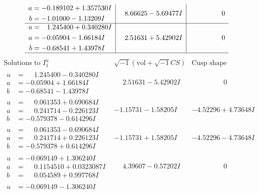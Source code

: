 \documentclass[1p]{elsarticle_modified}
\theoremstyle{definition}
\newcommand{\I}{\sqrt{-1}}
\begin{document}
$$\begin{array}{c|c|c}
\begin{aligned}
a &= -0.189102 + 1.357530 I \\
b &= -1.01000 - 1.13209 I\end{aligned}
 & \phantom{-}8.66625 - 5.69477 I & \phantom{-0.000000 } 0 \\ \hline\begin{aligned}
u &= \phantom{-}1.245400 + 0.340280 I \\
a &= -0.05904 - 1.66184 I \\
b &= -0.68541 + 1.43978 I\end{aligned}
 & \phantom{-}2.51631 + 5.42902 I & \phantom{-0.000000 } 0\\
 \hline 
 \end{array}$$\newpage$$\begin{array}{c|c|c}  
\text{Solutions to }I^u_{1}& \I (\text{vol} + \sqrt{-1}CS) & \text{Cusp shape}\\
 \hline 
\begin{aligned}
u &= \phantom{-}1.245400 - 0.340280 I \\
a &= -0.05904 + 1.66184 I \\
b &= -0.68541 - 1.43978 I\end{aligned}
 & \phantom{-}2.51631 - 5.42902 I & \phantom{-0.000000 } 0 \\ \hline\begin{aligned}
u &= \phantom{-}0.061353 + 0.690684 I \\
a &= \phantom{-}0.241714 - 0.226123 I \\
b &= -0.579378 - 0.614296 I\end{aligned}
 & -1.15731 - 1.58205 I & -4.52296 + 4.73648 I \\ \hline\begin{aligned}
u &= \phantom{-}0.061353 - 0.690684 I \\
a &= \phantom{-}0.241714 + 0.226123 I \\
b &= -0.579378 + 0.614296 I\end{aligned}
 & -1.15731 + 1.58205 I & -4.52296 - 4.73648 I \\ \hline\begin{aligned}
u &= -0.069149 + 1.306240 I \\
a &= \phantom{-}0.1154510 + 0.0323087 I \\
b &= \phantom{-}0.054589 + 0.997768 I\end{aligned}
 & \phantom{-}4.39607 - 0.57202 I & \phantom{-0.000000 } 0 \\ \hline\begin{aligned}
u &= -0.069149 - 1.306240 I \\

\end{aligned}
\end{array}$$
\end{document}
